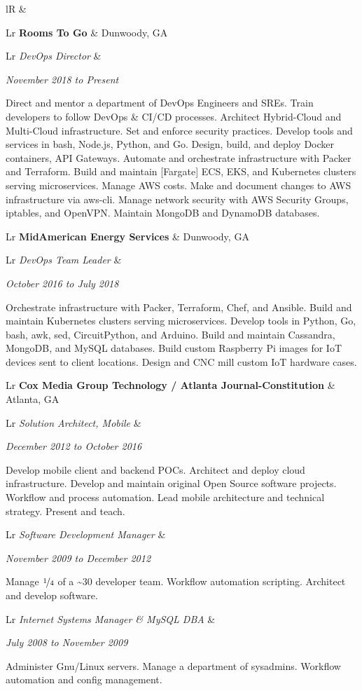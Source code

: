 \documentclass[letterpaper,10pt]{article}
\newcommand{\sizeF}[0]{\fontsize{11pt}{13pt}\selectfont}
\newcounter{skipfirstcounter}
\newcommand{\skipfirst}[1]{
    \ifthenelse{\equal{\value{skipfirstcounter}}{0}}{#1}{#1}
    \addtocounter{skipfirstcounter}{1}
}
\newcommand{\blocktitle}[1]{
    \setcounter{skipfirstcounter}{0}
    \begin{tabularx}{\textwidth}{lR}
        {\sizeF\sc{#1}} & \noindent\hrulefill\\
    \end{tabularx}
}
\newcommand{\blockExperience}[1]{
    \blocktitle{Career}%
    #1%
    \vspace{2mm}%
}
\newcommand{\sectionheaderfirst}[2]{
    \begin{tabularx}{\textwidth}{Lr}%
    \textbf{#1} & #2\\%
    \end{tabularx}%
}
\newcommand{\sectionheader}[2]{
    \vspace{2mm}%
    \sectionheaderfirst{#1}{#2}%
}
\newcommand{\sectionsub}[2]{
    {\def\arraystretch{1}
        \begin{tabularx}{\textwidth}{Lr}
        \rowcolor[rgb]{.9,.9,.9}
        \emph{#1} &
        \rule{0mm}{3.2mm} %
        \emph{#2} \\
        \addlinespace[0.4mm]
        \end{tabularx}
    }
}
\newcommand{\sectionbody}[1]{
    #1
    \vspace{1mm}
}
\begin{document}
\blockExperience{
    \sectionheaderfirst
    {Rooms To Go}{Dunwoody, GA}
    \sectionsub
    {DevOps Director}
    {November 2018 to Present}
    \sectionbody{
    Direct and mentor a department of DevOps Engineers and SREs.
    Train developers to follow DevOps & CI/CD processes.
    Architect Hybrid-Cloud and Multi-Cloud infrastructure.
    Set and enforce security practices.
    Develop tools and services in bash, Node.js, Python, and Go.
    Design, build, and deploy Docker containers, API Gateways.
    Automate and orchestrate infrastructure with Packer and Terraform.
    Build and maintain [Fargate] ECS, EKS, and Kubernetes clusters serving microservices.
    Manage AWS costs.
    Make and document changes to AWS infrastructure via aws-cli.
    Manage network security with AWS Security Groups, iptables, and OpenVPN.
    Maintain MongoDB and DynamoDB databases.
    }

    \sectionheader
    {MidAmerican Energy Services}{Dunwoody, GA}
    \sectionsub
    {DevOps Team Leader}
    {October 2016 to July 2018}
    \sectionbody{
    Orchestrate infrastructure with Packer, Terraform, Chef, and Ansible.
    Build and maintain Kubernetes clusters serving microservices.
    Develop tools in Python, Go, bash, awk, sed, CircuitPython, and Arduino.
    Build and maintain Cassandra, MongoDB, and MySQL databases.
    Build custom Raspberry Pi images for IoT devices sent to client locations.
    Design and CNC mill custom IoT hardware cases.
    }

    \sectionheader
    {Cox Media Group Technology / Atlanta Journal-Constitution}{Atlanta, GA}
    \sectionsub
    {Solution Architect, Mobile}
    {December 2012 to October 2016}
    \sectionbody{
    Develop mobile client and backend POCs.
    Architect and deploy cloud infrastructure.
    Develop and maintain original Open Source software projects.
    Workflow and process automation.
    Lead mobile architecture and technical strategy.
    Present and teach.
    }

    \sectionsub
    {Software Development Manager}
    {November 2009 to December 2012}
    \sectionbody{
    Manage $\nicefrac{1}{4}$ of a \~{}30 developer team.
    Workflow automation scripting.
    Architect and develop software.
    }

    \sectionsub
    {Internet Systems Manager \& MySQL DBA}
    {July 2008 to November 2009}
    \sectionbody{
    Administer Gnu/Linux servers.
    Manage a department of sysadmins.
    Workflow automation and config management.
    }

}
\end{document}
